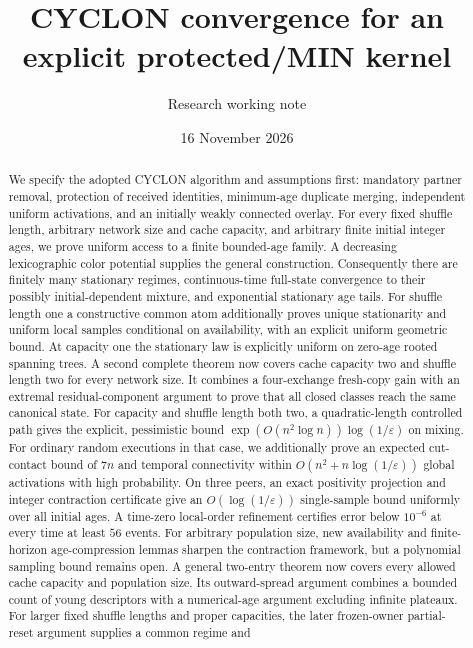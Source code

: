 \documentclass[11pt]{article}
\title{CYCLON convergence for an explicit protected/MIN kernel}
\author{Research working note}
\date{16 November 2026}
\begin{document}
\maketitle

\begin{abstract}
We specify the adopted CYCLON algorithm and assumptions first:
mandatory partner removal, protection of received identities,
minimum-age duplicate merging, independent uniform activations, and
an initially weakly connected overlay.
For every fixed shuffle length, arbitrary network size and cache
capacity, and arbitrary finite initial integer ages, we prove
uniform access to a finite bounded-age family. A decreasing
lexicographic color potential supplies the general construction.
Consequently there are finitely many stationary regimes,
continuous-time full-state convergence to their possibly
initial-dependent mixture, and exponential stationary age tails.
For shuffle length one a constructive common atom additionally
proves unique stationarity and uniform local samples conditional
on availability, with an explicit uniform geometric bound.
At capacity one the stationary law is explicitly uniform on
zero-age rooted spanning trees. A second complete theorem
now covers cache capacity two and shuffle length two for
every network size. It combines a four-exchange fresh-copy
gain with an extremal residual-component argument to prove
that all closed classes reach the same canonical state.
For capacity and shuffle length both two, a quadratic-length
controlled path gives the explicit, pessimistic bound
$\exp(O(n^2\log n))\log(1/\varepsilon)$ on mixing.
For ordinary random executions in that case, we additionally
prove an expected cut-contact bound of $7n$ and temporal
connectivity within $O(n^2+n\log(1/\varepsilon))$ global
activations with high probability. On three peers, an exact
positivity projection and integer contraction certificate give
an $O(\log(1/\varepsilon))$ single-sample bound uniformly
over all initial ages. A time-zero local-order refinement
certifies error below $10^{-6}$ at every time at least $56$
events. For arbitrary population size, new availability and
finite-horizon age-compression lemmas sharpen the contraction
framework, but a polynomial sampling bound remains open.
A general two-entry theorem now covers every allowed
cache capacity and population size. Its outward-spread
argument combines a bounded count of young descriptors
with a numerical-age argument excluding infinite plateaux.
For larger fixed shuffle lengths and proper capacities, the later
frozen-owner partial-reset argument supplies a common regime and

\end{abstract}
\end{document}
